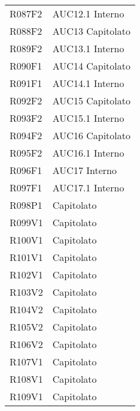 \documentclass[../analisi-dei-requisiti.tex]{subfiles}
\begin{document}
\begin{longtable}[H]{ p{4cm} | p{4cm} }
  R087F2                               & AUC12.1 Interno               \\
  R088F2                               & AUC13 Capitolato              \\
  R089F2                               & AUC13.1 Interno               \\
  R090F1                               & AUC14 Capitolato              \\
  R091F1                               & AUC14.1 Interno               \\
  R092F2                               & AUC15 Capitolato              \\
  R093F2                               & AUC15.1 Interno               \\
  R094F2                               & AUC16 Capitolato              \\
  R095F2                               & AUC16.1 Interno               \\
  R096F1                               & AUC17 Interno                 \\
  R097F1                               & AUC17.1 Interno               \\
  R098P1                               & Capitolato                    \\
  R099V1                               & Capitolato                    \\
  R100V1                               & Capitolato                    \\
  R101V1                               & Capitolato                    \\
  R102V1                               & Capitolato                    \\
  R103V2                               & Capitolato                    \\
  R104V2                               & Capitolato                    \\
  R105V2                               & Capitolato                    \\
  R106V2                               & Capitolato                    \\
  R107V1                               & Capitolato                    \\
  R108V1                               & Capitolato                    \\
  R109V1                               & Capitolato                    \\

\end{longtable}
\end{document}
